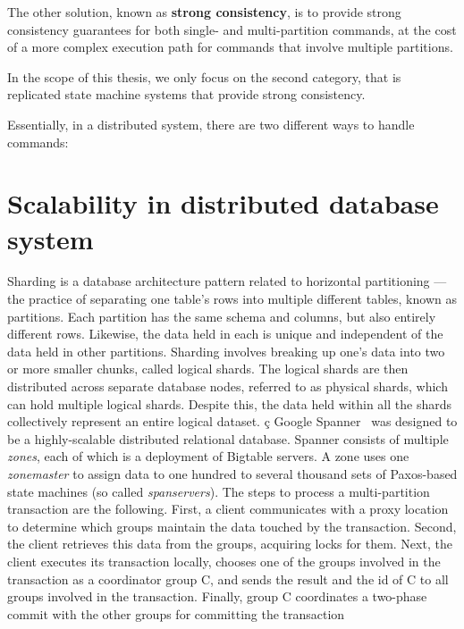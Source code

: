 The other solution, known as \textbf{strong consistency}, is to
provide strong consistency guarantees for both single- and multi-partition
commands, at the cost of a more complex execution path for commands that involve
multiple partitions.


In the scope of this thesis, we only focus on the second
category, that is replicated state machine systems that provide strong
consistency.

Essentially, in a distributed system, there are two different ways to handle
commands:


\section{Scalability in distributed database system}

Sharding is a database architecture pattern related to horizontal partitioning —
the practice of separating one table’s rows into multiple different tables,
known as partitions. Each partition has the same schema and columns, but also
entirely different rows. Likewise, the data held in each is unique and
independent of the data held in other partitions. Sharding involves breaking up
one’s data into two or more smaller chunks, called logical shards. The logical
shards are then distributed across separate database nodes, referred to as
physical shards, which can hold multiple logical shards. Despite this, the data
held within all the shards collectively represent an entire logical dataset.
ç
Google Spanner~\cite{corbett2013spanner} was designed to be a highly-scalable
distributed relational database. Spanner consists of multiple \emph{zones}, each
of which is a deployment of Bigtable servers. A zone uses one \emph{zonemaster}
to assign data to one hundred to several thousand sets of Paxos-based state
machines (so called \emph{spanservers}).
The steps to process a multi-partition transaction are the following. First, a
client communicates with a proxy location to determine which groups maintain the
data touched by the transaction. Second, the client retrieves this data from the
groups, acquiring locks for them. Next, the client executes its transaction
locally, chooses one of the groups involved in the transaction as a coordinator
group C, and sends the result and the id of C to all groups involved in the
transaction. Finally, group C coordinates a two-phase commit with the other
groups for committing the transaction

